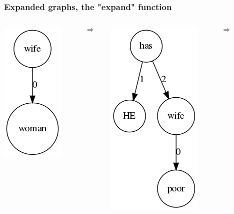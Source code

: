 \documentclass[bigger]{beamer}
\begin{document}
\begin{frame}
\frametitle{Expanded graphs, the "expand" function}
\begin{columns}
	\begin{column}{0.1\textwidth}
		\pause \includegraphics[scale=0.4]{pics/wife.png}
	\end{column}
	\begin{column}{0.1\textwidth}
	\pause \[\Rightarrow\]
	\end{column}
	\begin{column}{0.2\textwidth}
		\pause \includegraphics[scale=0.4]{pics/wifepoor.png}
	\end{column}
	\begin{column}{0.1\textwidth}
		\pause \[\Rightarrow\]
	\end{column}
	\begin{column}{0.3\textwidth}

\end{column}
\end{columns}
\end{frame}
\end{document}
